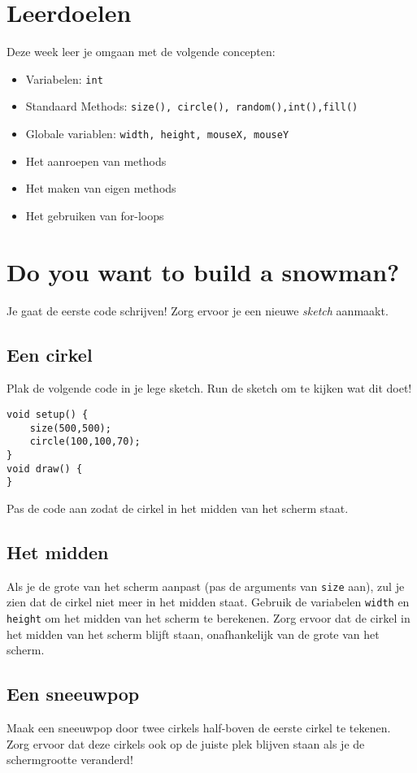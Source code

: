 \newcommand{\tttt}{Recursie}
\newcommand{\dddd}{Datum 1}



\section{Leerdoelen}
Deze week leer je omgaan met de volgende concepten:
\begin{itemize}
    \item Variabelen: \texttt{int}
    \item Standaard Methods: \texttt{size(), circle(), random(),int(),fill()}
    \item Globale variablen: \texttt{width, height, mouseX, mouseY}
    \item Het aanroepen van methods
    \item Het maken van eigen methods
    \item Het gebruiken van for-loops
\end{itemize}

\section{Do you want to build a snowman?}
Je gaat de eerste code schrijven! Zorg ervoor je een nieuwe \textit{sketch} aanmaakt.
\subsection{Een cirkel}
Plak de volgende code in je lege sketch. Run de sketch om te kijken wat dit doet!
\begin{lstlisting}
void setup() {
    size(500,500);
    circle(100,100,70);
}
void draw() {
}
\end{lstlisting}
Pas de code aan zodat de cirkel in het midden van het scherm staat.
\subsection{Het midden}
Als je de grote van het scherm aanpast (pas de arguments van \texttt{size} aan), zul je zien dat de cirkel niet meer in het midden staat.
Gebruik de variabelen \texttt{width} en \texttt{height} om het midden van het scherm te berekenen. Zorg ervoor dat de cirkel in het midden van het scherm blijft staan, onafhankelijk van de grote van het scherm.
\subsection{Een sneeuwpop}
Maak een sneeuwpop door twee cirkels half-boven de eerste cirkel te tekenen. Zorg ervoor dat deze cirkels ook op de juiste plek blijven staan als je de schermgrootte veranderd!
